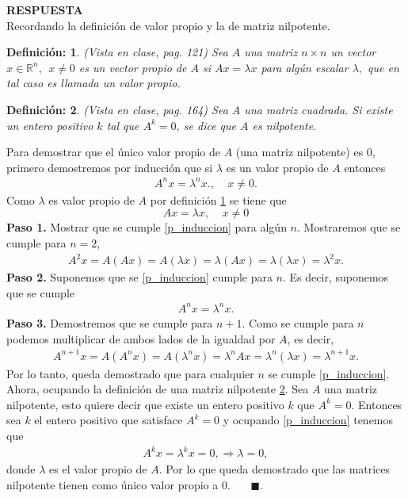 \documentclass[11pt,letterpaper]{article}
\newcommand{\mR}{\mathbb{R}}
\newcommand{\res}{\textbf{RESPUESTA}\\}
\newcommand{\fin}{$\blacksquare.$}
\newtheorem{thmd}{Definición:}
\begin{document}
\begin{enumerate}
\res Recordando la definición de valor propio y la de matriz nilpotente. 
\begin{framed}
    \begin{thmd} \label{d_valor_propio}
	(Vista en clase, pag. 121) Sea $A$ una matriz $n\times n$ un vector $x\in \mR^n, \ \ x\neq 0$ es un vector propio de $A$ si $Ax=\lambda x$ para algún escalar $\lambda,$ que en tal caso es llamada un valor propio.
    \end{thmd}
\end{framed}
\begin{framed}
    \begin{thmd} \label{d_nilpotente}
	(Vista en clase, pag. 164) Sea $A$ una matriz cuadrada. Si existe un entero positivo $k$ tal que $A^k=0$, se dice que $A$ es nilpotente. 
    \end{thmd}
\end{framed}
Para demostrar que el único valor propio de $A$ (una matriz nilpotente) es 0, primero demostremos  por inducción que si $\lambda$ es un valor propio de $A$ entonces
\begin{align} \label{p_induccion}
A^n x=\lambda^n x.,\ \ \ \ \ x\neq 0.
\end{align} 
Como $\lambda$ es valor propio de $A$ por definición \ref{d_valor_propio} se tiene que 
$$Ax=\lambda x, \ \ \ \ \ x\neq 0$$
\textbf{Paso 1.} Mostrar que se cumple \ref{p_induccion} para algún $n$. Mostraremos que se cumple para $n=2$,
\begin{align*}
A^2x=A(Ax)=A(\lambda x)=\lambda (Ax)=\lambda(\lambda x)=\lambda^2 x.
\end{align*}
\textbf{Paso 2.} Suponemos que se \ref{p_induccion} cumple para $n$. Es decir, suponemos que se cumple
\begin{align*}
A^n x = \lambda^n x.
\end{align*}
\textbf{Paso 3.} Demostremos que se cumple para $n+1$. Como se cumple para $n$ podemos multiplicar de ambos lados de la igualdad por $A$, es decir,
\begin{align*}
A^{n+1}x = A(A^n x) = A(\lambda^n x)=\lambda^n Ax=\lambda^n (\lambda x)=\lambda^{n+1} x.
\end{align*}
Por lo tanto, queda demostrado que para cualquier $n$ se cumple \ref{p_induccion}. Ahora, ocupando la definición de una matriz nilpotente \ref{d_nilpotente}. Sea $A$ una matriz nilpotente, esto quiere decir que existe un entero positivo $k$ que $A^k=0$. Entonces sea $k$ el entero positivo que satisface $A^k=0$ y ocupando \ref{p_induccion} tenemos que
\begin{align*}
A^k x=\lambda^k x = 0, \Rightarrow \lambda =0,
\end{align*}
donde $\lambda$ es el valor propio de $A$. Por lo que queda demostrado que las matrices nilpotente tienen como único valor propio a 0. \ \ \ \fin
 
\end{enumerate}
\end{document}
